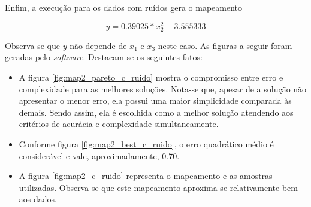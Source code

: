 	\FloatBarrier

Enfim, a execução para os dados com ruídos gera o mapeamento 

\begin{equation}
y = 0.39025*x_2^2 - 3.555333
\label{eq:map2_r}
\end{equation}

Observa-se que \(y\) não depende de \(x_1\) e \(x_3\) neste caso. As figuras a
seguir foram geradas pelo \textit{software}. Destacam-se os seguintes fatos:

\begin{itemize}
  \item A figura \ref{fig:map2_pareto_c_ruido} mostra o compromisso entre erro e
  complexidade para as melhores soluções. Nota-se que, apesar de a solução não
  apresentar o menor erro, ela possui uma maior simplicidade comparada às
  demais. Sendo assim, ela é escolhida como a melhor solução atendendo aos
  critérios de acurácia e complexidade simultaneamente.
  \item Conforme figura \ref{fig:map2_best_c_ruido}, o erro quadrático médio é
  considerável e vale, aproximadamente, 0.70.
  \item A figura \ref{fig:map2_c_ruido} representa o mapeamento e as amostras
  utilizadas. Observa-se que este mapeamento aproxima-se relativamente bem aos
  dados.
\end{itemize}

\FloatBarrier
			    
